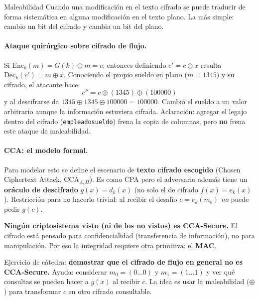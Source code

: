 \documentclass[../main.tex]{subfiles}
\begin{document}
\begin{definicion}{Maleabilidad}
Cuando una modificación en el texto cifrado se puede traducir de forma sistemática
en alguna modificación en el texto plano. La más simple: cambio un bit del cifrado
y cambia un bit del plano.
\end{definicion}

\paragraph{Ataque quirúrgico sobre cifrado de flujo.} Si $\mathrm{Enc}_k(m)=G(k)\oplus m=c$,
entonces definiendo $c'=c\oplus x$ resulta $\mathrm{Dec}_k(c')=m\oplus x$. Conociendo
el propio sueldo en plano ($m=1345$) y su cifrado, el atacante hace:
$$c'' = c \oplus (1345) \oplus (100000)$$
y al descifrarse da $1345 \oplus 1345 \oplus 100000 = 100000$. Cambió el sueldo a un
valor arbitrario aunque la información estuviera cifrada. Aclaración: agregar el
legajo dentro del cifrado (\texttt{empleado\textbar\textbar sueldo}) frena la copia
de columnas, pero \textbf{no} frena este ataque de maleabilidad.

\paragraph{CCA: el modelo formal.} Para modelar esto se define el escenario de
\textbf{texto cifrado escogido} (Chosen Ciphertext Attack, $\mathrm{CCA}_{A,\Pi}$).
Es como CPA pero el adversario además tiene un \textbf{oráculo de descifrado}
$g(x)=d_k(x)$ (no solo el de cifrado $f(x)=e_k(x)$). Restricción para no hacerlo
trivial: al recibir el desafío $c=e_k(m_b)$ \emph{no} puede pedir $g(c)$.

\begin{destacado}
\textbf{Ningún criptosistema visto (ni de los no vistos) es CCA-Secure.} El cifrado
está pensado para confidencialidad (transferencia de información), no para
manipulación. Por eso la integridad requiere otra primitiva: el \textbf{MAC}.
\end{destacado}

\begin{examen}
Ejercicio de cátedra: \textbf{demostrar que el cifrado de flujo en general no es
CCA-Secure.} Ayuda: considerar $m_0=(0\ldots0)$ y $m_1=(1\ldots1)$ y ver qué
consultas se pueden hacer a $g(x)$ al recibir $c$. La idea es usar la maleabilidad
($\oplus$) para transformar $c$ en otro cifrado consultable.
\end{examen}
\end{document}
